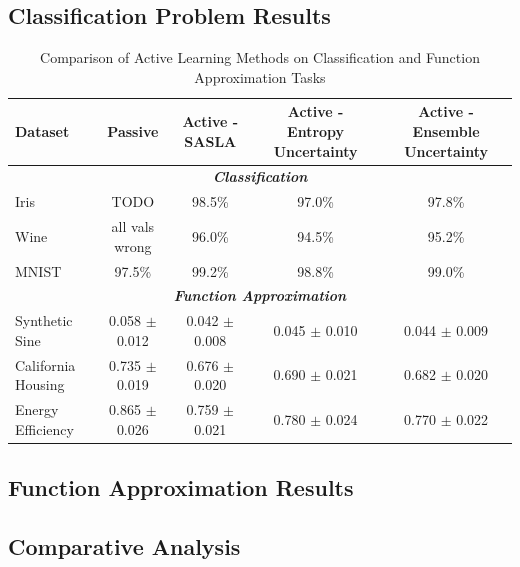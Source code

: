 \documentclass[10pt, conference]{IEEEtran}
\begin{document}
\subsection{Classification Problem Results}
\begin{table}[ht]
	\caption{Comparison of Active Learning Methods on Classification and Function Approximation Tasks}
	\label{tab:comparison}
	\centering
	\begin{tabular}{|l|c|c|c|c|}
		\hline
		\textbf{Dataset} & \textbf{Passive} & \textbf{Active - SASLA} & \textbf{Active - Entropy Uncertainty} & \textbf{Active - Ensemble Uncertainty} \\
		\hline
		\multicolumn{5}{|c|}{\textbf{\textit{Classification}}} \\
		\hline
		Iris & TODO & 98.5\% & 97.0\% & 97.8\% \\
		Wine & all vals wrong & 96.0\% & 94.5\% & 95.2\% \\
		MNIST & 97.5\% & 99.2\% & 98.8\% & 99.0\% \\
		\hline
		\multicolumn{5}{|c|}{\textbf{\textit{Function Approximation}}} \\
		\hline
		Synthetic Sine & 0.058 $\pm$ 0.012 & 0.042 $\pm$ 0.008 & 0.045 $\pm$ 0.010 & 0.044 $\pm$ 0.009 \\
		California Housing & 0.735 $\pm$ 0.019 & 0.676 $\pm$ 0.020 & 0.690 $\pm$ 0.021 & 0.682 $\pm$ 0.020 \\
		Energy Efficiency & 0.865 $\pm$ 0.026 & 0.759 $\pm$ 0.021 & 0.780 $\pm$ 0.024 & 0.770 $\pm$ 0.022 \\
		\hline
	\end{tabular}
\end{table}


\subsection{Function Approximation Results}

\subsection{Comparative Analysis}
\end{document}
